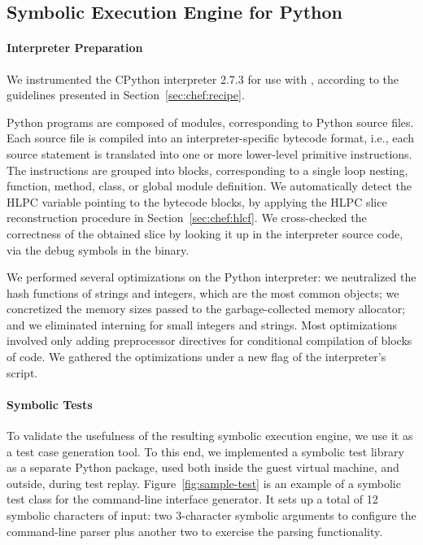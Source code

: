 \subsection{Symbolic Execution Engine for Python}
\label{sec:eval:python-proto}

\paragraph{Interpreter Preparation}

We instrumented the CPython interpreter 2.7.3 for use with \chef, according to the guidelines presented in Section~\ref{sec:chef:recipe}.

Python programs are composed of modules, corresponding to Python source files.  Each source file is compiled into an interpreter-specific bytecode format, i.e., each source statement is translated into one or more lower-level primitive instructions.  The instructions are grouped into blocks, corresponding to a single loop nesting, function, method, class, or global module definition.
%
We automatically detect the HLPC variable pointing to the bytecode blocks, by applying the HLPC slice reconstruction procedure in Section~\ref{sec:chef:hlcf}.  We cross-checked the correctness of the obtained slice by looking it up in the interpreter source code, via the debug symbols in the binary.

We performed several optimizations on the Python interpreter: we neutralized the hash functions of strings and integers, which are the most common objects; we concretized the memory sizes passed to the garbage-collected memory allocator; and we eliminated interning for small integers and strings.    
%
Most optimizations involved only adding preprocessor directives for conditional compilation of blocks of code.
%
We gathered the optimizations under a new  flag of the interpreter's  script.

\paragraph{Symbolic Tests}

To validate the usefulness of the resulting symbolic execution engine, we use it as a test case generation tool.  To this end, we implemented a symbolic test library as a separate Python package, used both inside the guest virtual machine, and outside, during test replay.
%
Figure~\ref{fig:sample-test} is an example of a symbolic test class for the  command-line interface generator. It sets up a total of 12 symbolic characters of input: two 3-character symbolic arguments to configure the command-line parser plus another two to exercise the parsing functionality.

